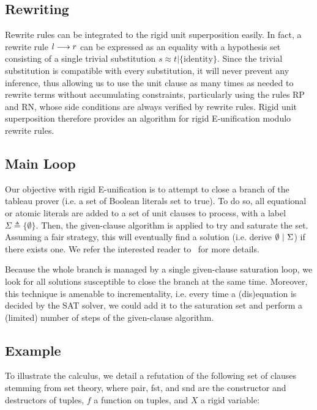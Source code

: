 \subsection{Rewriting}

Rewrite rules can be integrated to the rigid unit superposition easily. In fact,
a rewrite rule $l\longrightarrow{}r$ can be expressed as an equality with a hypothesis set
consisting of a single trivial substitution
$s\approx{}t|\{\text{identity}\}$. Since the trivial substitution is compatible
with every substitution, it will never prevent any inference, thus allowing us
to use the unit clause as many times as needed to rewrite terms without
accumulating constraints, particularly using the rules RP and RN, whose side
conditions are always verified by rewrite rules. Rigid unit superposition
therefore provides an algorithm for rigid E-unification modulo rewrite rules.

\subsection{Main Loop}

Our objective with rigid E-unification is to attempt to close a branch of the
tableau prover (i.e. a set of Boolean literals set to true). To do so, all
equational or atomic literals are added to a set of unit clauses to process,
with a label $\Sigma \triangleq \{ \emptyset \}$. Then, the given-clause
algorithm is applied to try and saturate the set. Assuming a fair strategy, this
will eventually find a solution (i.e. derive
$\emptyset ~|~ \Sigma$) if there exists one. We refer the
interested reader to~\cite{SS02} for more details.

Because the whole branch is managed by a single given-clause saturation loop, we
look for all solutions susceptible to close the branch at the same time.
Moreover, this technique is amenable to incrementality, i.e. every time a
(dis)equation is decided by the SAT solver, we could add it to the saturation
set and perform a (limited) number of steps of the given-clause algorithm.

\subsection{Example}

To illustrate the calculus, we detail a refutation of the following set of
clauses stemming from set theory, where pair, fst, and snd are the constructor
and destructors of tuples, $f$ a function on tuples, and $X$ a rigid variable:

